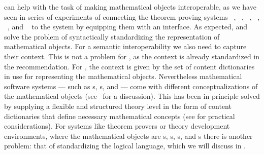 {\omdoc} can help with the task of making mathematical objects interoperable, as we have
seen in series of experiments of connecting the theorem proving systems
{\OMEGA}~\cite{BenzmuellerEtAl:otama97}, {\inka}~\cite{HuSe:itng96}, {\pvs}~\cite{OwRu92},
{\lambdaclam}~\cite{RicSmaGre:ppihol98}, {\tps}~\cite{AnBi:tatps96}, and
{\coq}~\cite{CoqManual} to the {\mbase} system by equipping them with an {\omdoc}
interface. As expected, {\openmath} and {\cmathml} solve the problem of syntactically
standardizing the representation of mathematical objects. For a semantic interoperability
we also need to capture their context. This is not a problem for {\cmathml}, as the
context is already standardized in the {\mathml} recommendation. For {\openmath}, the
context is given by the set of content dictionaries in use for representing the
mathematical objects. Nevertheless mathematical software systems --- such as
{s}, {s}, and
{} --- come with different conceptualizations of the
mathematical objects (see~\cite{KohKoh:aesmk05} for a discussion). This has been in
principle solved by supplying a flexible and structured theory level in the form of
{\omdoc} content dictionaries that define necessary mathematical concepts (see
{} for practical considerations). For systems like
theorem provers or theory development environments, where the mathematical objects are
{s}, {s}, {s}, and
{s} there is another problem: that of standardizing the logical language,
which we will discuss in {}.

